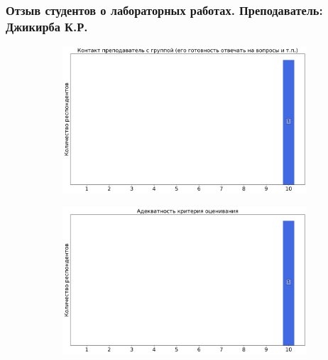 	\subsubsection{Отзыв студентов о лабораторных работах. Преподаватель: Джикирба К.Р.}
		\begin{figure}[H]
			\centering
			\begin{subfigure}[b]{0.45\textwidth}
				\centering
				\includegraphics[width=\textwidth]{images/2 course/Общая физика - электричество и магнетизм/labniks-marks-Джикирба К.Р.-0.png}
			\end{subfigure}
			\begin{subfigure}[b]{0.45\textwidth}
				\centering
				\includegraphics[width=\textwidth]{images/2 course/Общая физика - электричество и магнетизм/labniks-marks-Джикирба К.Р.-1.png}
			\end{subfigure}
			\begin{subfigure}[b]{0.45\textwidth}
				\centering

\end{subfigure}
\end{figure}
